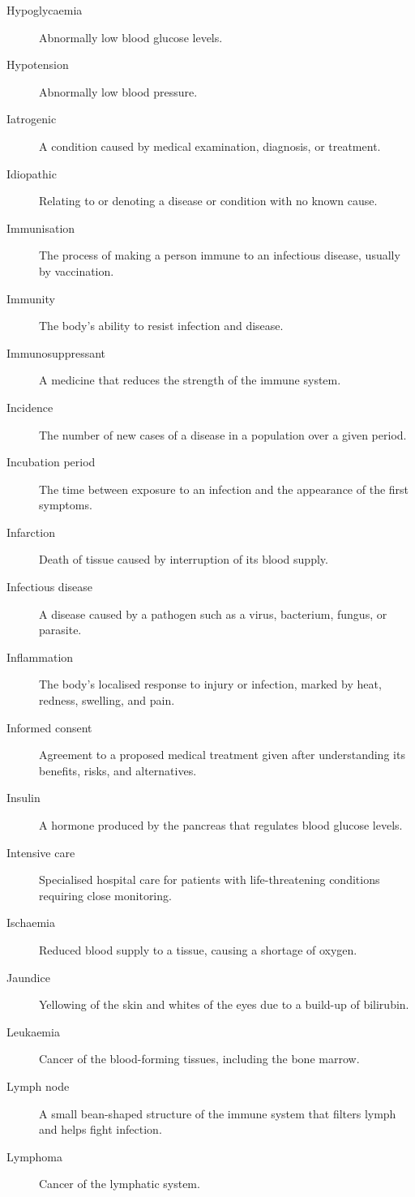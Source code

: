 \documentclass[12pt,oneside]{book}
\begin{document}
\begin{description}
  \item[Hypoglycaemia] Abnormally low blood glucose levels.
  \item[Hypotension] Abnormally low blood pressure.
  \item[Iatrogenic] A condition caused by medical examination, diagnosis, or treatment.
  \item[Idiopathic] Relating to or denoting a disease or condition with no known cause.
  \item[Immunisation] The process of making a person immune to an infectious disease, usually by vaccination.
  \item[Immunity] The body's ability to resist infection and disease.
  \item[Immunosuppressant] A medicine that reduces the strength of the immune system.
  \item[Incidence] The number of new cases of a disease in a population over a given period.
  \item[Incubation period] The time between exposure to an infection and the appearance of the first symptoms.
  \item[Infarction] Death of tissue caused by interruption of its blood supply.
  \item[Infectious disease] A disease caused by a pathogen such as a virus, bacterium, fungus, or parasite.
  \item[Inflammation] The body's localised response to injury or infection, marked by heat, redness, swelling, and pain.
  \item[Informed consent] Agreement to a proposed medical treatment given after understanding its benefits, risks, and alternatives.
  \item[Insulin] A hormone produced by the pancreas that regulates blood glucose levels.
  \item[Intensive care] Specialised hospital care for patients with life-threatening conditions requiring close monitoring.
  \item[Ischaemia] Reduced blood supply to a tissue, causing a shortage of oxygen.
  \item[Jaundice] Yellowing of the skin and whites of the eyes due to a build-up of bilirubin.
  \item[Leukaemia] Cancer of the blood-forming tissues, including the bone marrow.
  \item[Lymph node] A small bean-shaped structure of the immune system that filters lymph and helps fight infection.
  \item[Lymphoma] Cancer of the lymphatic system.

\end{description}
\end{document}
